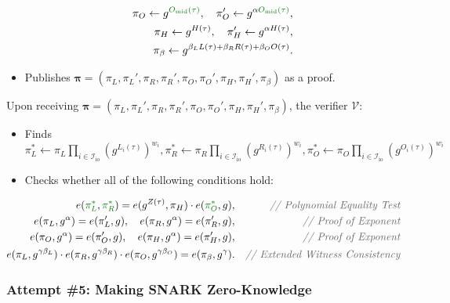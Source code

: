 \documentclass[../lecture-notes.tex]{subfiles}
\begin{document}
\begin{tcolorbox}
\begin{itemize}[label=]
\begin{align*}
            \pi_O \gets g^{\textcolor{green!50!black}{O_{\text{mid}}(\tau)}}, \quad \pi_O' \gets g^{\alpha \textcolor{green!50!black}{O_{\text{mid}}(\tau)}}, \\
            \pi_H \gets g^{H(\tau)}, \quad \pi_H' \gets g^{\alpha H(\tau)}, \\
            \pi_{\beta} \gets g^{\beta_LL(\tau) + \beta_RR(\tau) + \beta_OO(\tau)}.
        \end{align*}
        \item Publishes $\boldsymbol{\pi} = (\pi_L,\pi_L',\pi_R,\pi_R',\pi_O,\pi_O',\pi_H,\pi_H',\pi_{\beta})$ as a proof.
    \end{itemize}

    Upon receiving $\boldsymbol{\pi} = (\pi_L,\pi_L',\pi_R,\pi_R',\pi_O,\pi_O',\pi_H,\pi_H',\pi_{\beta})$, the verifier $\mathcal{V}$:
    \begin{itemize}[label=]
        \item \textcolor{green!50!black}{Finds $\pi_L^* \gets \pi_L\prod_{i \in \mathcal{I}_{\text{io}}} (g^{L_i(\tau)})^{w_i},\pi_R^* \gets \pi_R\prod_{i \in \mathcal{I}_{\text{io}}} (g^{R_i(\tau)})^{w_i},\pi_O^* \gets \pi_O\prod_{i \in \mathcal{I}_{\text{io}}} (g^{O_i(\tau)})^{w_i}$}
        \item Checks whether all of the following conditions hold:
    \end{itemize}
    \begin{align*}
        e(\textcolor{green!50!black}{\pi_L^*}, \textcolor{green!50!black}{\pi_R^*}) = e(g^{Z(\tau)}, \pi_H) \cdot e(\textcolor{green!50!black}{\pi_O^*}, g),&&\textcolor{gray!80!black}{\textit{// Polynomial Equality Test}} \\
        e(\pi_L, g^{\alpha}) = e(\pi_L', g), \quad e(\pi_R, g^{\alpha}) = e(\pi_R', g),&&\textcolor{gray!80!black}{\textit{// Proof of Exponent}} \\
        e(\pi_O, g^{\alpha}) = e(\pi_O', g), \quad e(\pi_H, g^{\alpha}) = e(\pi_H', g),&&\textcolor{gray!80!black}{\textit{// Proof of Exponent}} \\
        e(\pi_L, g^{\gamma\beta_L}) \cdot e(\pi_R, g^{\gamma\beta_R}) \cdot e(\pi_O, g^{\gamma\beta_O}) = e(\pi_{\beta}, g^{\gamma}).&&\textcolor{gray!80!black}{\textit{// Extended Witness Consistency}}
    \end{align*}
\end{tcolorbox}

\subsubsection{Attempt \#5: Making SNARK Zero-Knowledge}
\end{document}
